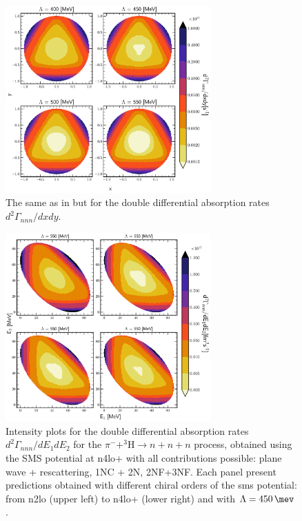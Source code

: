     \begin{figure}[h]
        \begin{center}
        \includegraphics[width=0.7\textwidth]{PlotData/PION/Dalitz_maps/figures/Dalitz_map_nnn_xy_cutofs.pdf}
        \end{center}
        \caption{The same as in  but for the double differential absorption rates
        $d^2 \Gamma_{nnn}/dxdy$.}
        \label{pion_nnn_xy_cutoff}
    \end{figure}


    \begin{figure}[h]
        \begin{center}
        \includegraphics[width=0.7\textwidth]{PlotData/PION/Dalitz_maps/figures/Dalitz_map_nnn_E1E2_orders.pdf}
        \end{center}
        \caption{Intensity plots for the double differential absorption rates
        $d^2 \Gamma_{nnn}/dE_1dE_2$ for the $\pi^- + ^3\text{H} \rightarrow n + n + n$
        process, obtained using the SMS potential at \gls{n4lo+}
        with all contributions possible: plane wave + rescattering, 1NC + 2N, 2NF+3NF.
        Each panel present predictions obtained with different chiral orders of the \gls{sms} potential:
        from \gls{n2lo} (upper left) to \gls{n4lo+} (lower right) and with $\Lambda = \SI{450}{\mev}$.}
        \label{pion_nnn_E1E2_order}
    \end{figure}


